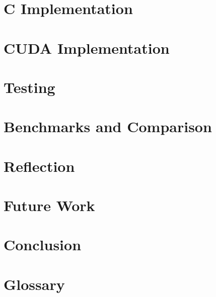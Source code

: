 \documentclass[oribibl]{llncs}
\numberwithin{equation}{section}
\begin{document}
	\section{C Implementation}
	
	\label{implementation}
	
	\section{CUDA Implementation}
	
	\label{realization}
		
	\section{Testing}
	
	\label{testing}
		
	\section{Benchmarks and Comparison}
	
	\label{bandc}
	
	\section{Reflection}
	
	\label{reflection}
		
	\section{Future Work}
	
	\label{futurework}
	
	\section{Conclusion}
	
	
	\label{conclusion}
	\newpage
	\section{Glossary}
	
	
		
\end{document}
